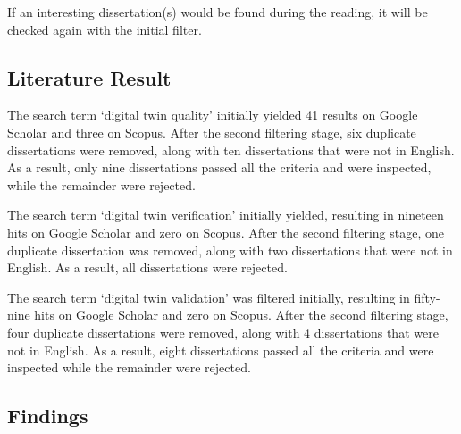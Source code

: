 \documentclass[9pt,conference]{IEEEtran}
\begin{document}
    If an interesting dissertation(s) would be found during the reading, it will be checked again with the initial filter.

    \subsection*{Literature Result}
    The search term `digital twin quality' initially yielded 41 results on Google Scholar and three on Scopus. 
    After the second filtering stage, six duplicate dissertations were removed, along with ten dissertations that were not in English. As a result, only nine dissertations passed all the criteria and were inspected, while the remainder were rejected.
    
    The search term `digital twin verification' initially yielded, resulting in nineteen hits on Google Scholar and zero on Scopus. After the second filtering stage, one duplicate dissertation was removed, along with two dissertations that were not in English.
    As a result, all dissertations were rejected. 

    The search term `digital twin validation' was filtered initially, resulting in fifty-nine hits on Google Scholar and zero on Scopus. After the second filtering stage, four duplicate dissertations were removed, along with 4 dissertations that were not in English.
    As a result, eight dissertations passed all the criteria and were inspected while the remainder were rejected.

    \subsection*{Findings}
\end{document}
